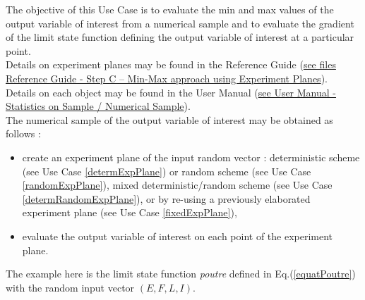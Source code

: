\renewcommand{\filename}{docUC_MinMax_Evaluation.tex}
\renewcommand{\filetitle}{UC : Min/Max research  from an experiment plane and sensitivity analysis}

\HeaderIIILevel



The objective of this Use Case is to evaluate the min and max values of the output variable of interest from a numerical sample and to evaluate the gradient of the limit state function defining the output variable of interest at a particular point. \\

Details on experiment planes  may be found in the Reference Guide (\href{OpenTURNS_ReferenceGuide.pdf}{see files Reference Guide - Step C -- Min-Max approach using Experiment Planes}).\\

Details on each object may be found in the User Manual  (\href{OpenTURNS_UserManual_TUI.pdf}{see User Manual - Statistics on Sample / Numerical Sample}).\\

The numerical sample of the output variable of interest may be obtained as follows :
\begin{itemize}
\item create an experiment plane of the input random vector : deterministic scheme (see Use Case \ref{determExpPlane}) or random scheme (see Use Case \ref{randomExpPlane}), mixed deterministic/random scheme (see Use Case \ref{determRandomExpPlane}), or by re-using a previously elaborated experiment plane (see Use Case \ref{fixedExpPlane}),
\item evaluate the output variable of interest on each point of the experiment plane.
\end{itemize}

The example here is the limit state function {\itshape poutre} defined in Eq.(\ref{equatPoutre}) with the random input vector $(E,F,L,I)$.\\

